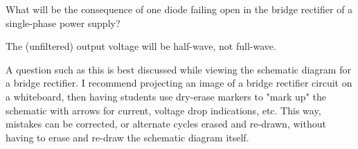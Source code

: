 

What will be the consequence of one diode failing open in the bridge rectifier of a single-phase power supply?







The (unfiltered) output voltage will be half-wave, not full-wave.







A question such as this is best discussed while viewing the schematic diagram for a bridge rectifier.  I recommend projecting an image of a bridge rectifier circuit on a whiteboard, then having students use dry-erase markers to "mark up" the schematic with arrows for current, voltage drop indications, etc.  This way, mistakes can be corrected, or alternate cycles erased and re-drawn, without having to erase and re-draw the schematic diagram itself.




